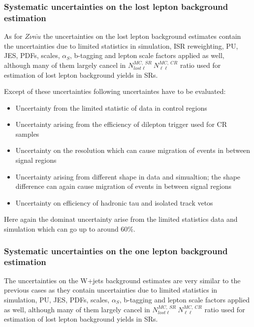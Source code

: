 \subsubsection{Systematic uncertainties on the lost lepton background estimation}

As for $Z \nu \bar{nu}$ the uncertainties on the lost lepton background estimates contain the uncertainties due to limited statistics in simulation, ISR reweighting, PU, JES, PDFs, scales, $\alpha_{S}$, b-tagging and lepton scale factors  applied as well, although many of them largely cancel in $N^{MC,~SR}_{lost \ell}\ N^{MC,~CR}_{\ell\ell}$ ratio used for estimation of lost lepton background yields in SRs.

Except of these uncertainties following uncertaintes have to be evaluated:

\begin{itemize} 
\item Uncertainty from the limited statistic of data in control regions
\item Uncertainty arising from the efficiency of dilepton trigger used for CR samples
\item Uncertainty on the \MET resolution which can cause migration of events in between signal regions
\item Uncertainty arising from different \MET shape in data and simualtion; the shape difference can again cause migration of events in between signal regions
\item Uncertainty on efficiency of hadronic tau and isolated track vetos %
\end{itemize}


Here again the dominat uncertainty arise from the limited statistics data and simulation which can go up to around 60\%.


\subsubsection{Systematic uncertainties on the one lepton background estimation}

The uncertainties on the W+jets background estimates are very similar to the previous cases as they contain uncertainties due to limited statistics in simulation, PU, JES, PDFs, scales, $\alpha_{S}$, b-tagging and lepton scale factors  applied as well, although many of them largely cancel in $N^{MC,~SR}_{lost \ell}\ N^{MC,~CR}_{\ell\ell}$ ratio used for estimation of lost lepton background yields in SRs.

